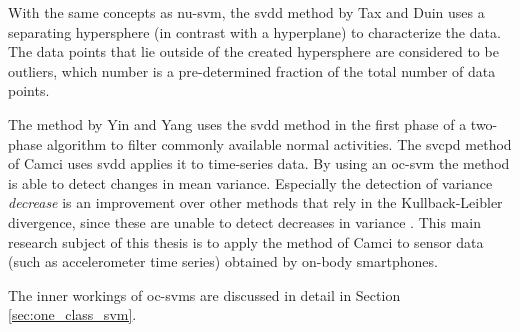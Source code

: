 With the same concepts as \gls{nu-svm}, the \gls{svdd} method by Tax and Duin \cite{tax1999support,tax2004support} uses a separating hypersphere (in contrast with a hyperplane) to characterize the data.
The data points that lie outside of the created hypersphere are considered to be outliers, which number is a pre-determined fraction of the total number of data points.

The method by Yin and Yang \cite{yin2008sensor} uses the \gls{svdd} method in the first phase of a two-phase algorithm to filter commonly available normal activities.
The \gls{svcpd} method of Camci \cite{camci2010change} uses \gls{svdd} applies it to time-series data.
By using an \gls{oc-svm} the method is able to detect changes in mean variance.
Especially the detection of variance \emph{decrease} is an improvement over other methods that rely in the Kullback-Leibler divergence, since these are unable to detect decreases in variance \cite{takeuchi2006unifying}.
This main research subject of this thesis is to apply the method of Camci \cite{camci2010change} to sensor data (such as accelerometer time series) obtained by on-body smartphones.

The inner workings of \glspl{oc-svm} are discussed in detail in Section \ref{sec:one_class_svm}.





